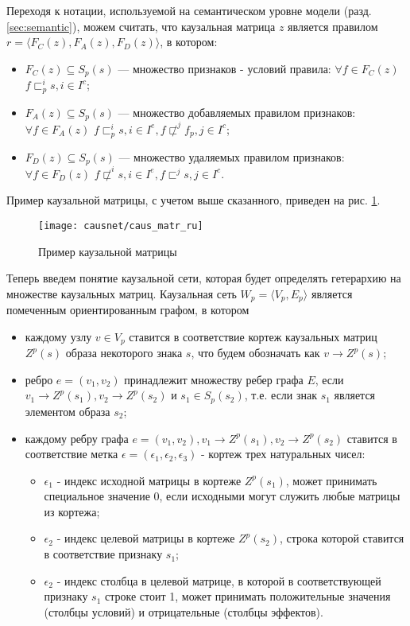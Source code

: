 \documentclass[12pt]{scrartcl}
\begin{document}
	
	Переходя к нотации, используемой на семантическом уровне модели (разд. \ref{sec:semantic}), можем считать, что каузальная матрица $z$ является правилом $r=\langle F_C(z),F_A(z),F_D(z)\rangle$, в котором:
	\begin{itemize}
		\item $F_C (z)\subseteq S_p(s)$ --- множество признаков - условий правила: $\forall f\in F_C(z)$ $f\sqsubset_p^i s, i\in I^c$;
		
		\item $F_A(z)\subseteq S_p(s)$ --- множество добавляемых правилом признаков: $\forall f\in F_A(z)$ $f\sqsubset_p^i s,i\in I^e, f\not\sqsubset^j f_p, j\in I^c$;
		
		\item $F_D(z)\subseteq S_p(s)$ --- множество удаляемых правилом признаков: $\forall f\in F_D(z)$ $f\not\sqsubset^i s, i\in I^e,f\sqsubset^j s, j\in I^c$.
	\end{itemize}

	Пример каузальной матрицы, с учетом выше сказанного, приведен на рис. \ref{fig:caus_matr}.

	\begin{figure}
		\centering
		\texttt{[image: causnet/caus\_matr\_ru]}
		\caption{Пример каузальной матрицы}	
		\label{fig:caus_matr}	
	\end{figure}	
	
	Теперь введем понятие каузальной сети, которая будет определять гетерархию на множестве каузальных матриц. Каузальная сеть $W_p=\langle V_p, E_p \rangle$ является помеченным ориентированным графом, в котором
	\begin{itemize}
		\item каждому узлу $v\in V_p$ ставится в соответствие кортеж каузальных матриц $Z^p(s)$ образа некоторого знака $s$, что будем обозначать как $v\rightarrow Z^p(s)$;
		\item ребро $e=(v_1, v_2)$ принадлежит множеству ребер графа $E$, если $v_1\rightarrow Z^p(s_1), v_2\rightarrow Z^p(s_2)$ и $s_1\in S_p(s_2)$, т.е. если знак $s_1$ является элементом образа $s_2$;
		\item каждому ребру графа $e=(v_1, v_2), v_1\rightarrow Z^p(s_1), v_2\rightarrow Z^p(s_2)$ ставится в соответствие метка $\epsilon=(\epsilon_1,\epsilon_2,\epsilon_3)$ - кортеж трех натуральных чисел:
		\begin{itemize}
			\item $\epsilon_1$ - индекс исходной матрицы в кортеже $Z^p(s_1)$, может принимать специальное значение 0, если исходными могут служить любые матрицы из кортежа;
			\item $\epsilon_2$ - индекс целевой матрицы в кортеже $Z^p(s_2)$, строка которой ставится в соответствие признаку $s_1$;
			\item $\epsilon_2$ - индекс столбца в целевой матрице, в которой в соответствующей признаку $s_1$ строке стоит 1, может принимать положительные значения (столбцы условий) и отрицательные (столбцы эффектов).
		\end{itemize}		
	\end{itemize}
	
\end{document}
